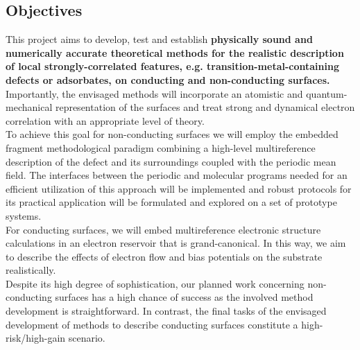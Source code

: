 \documentclass[a4paper,11pt,headings=normal]{scrartcl}
\begin{document}
\subsection{Objectives}
This project aims to develop, test and establish \textbf{physically sound and 
numerically accurate theoretical methods for the realistic description of 
local strongly-correlated features, e.g. transition-metal-containing defects or adsorbates, on conducting and non-conducting surfaces.}  Importantly, the 
envisaged methods will incorporate an atomistic and quantum-mechanical 
representation of the surfaces and treat strong and dynamical electron 
correlation with an appropriate level of theory.\\ 
To achieve this goal for non-conducting surfaces we will employ the embedded 
fragment methodological paradigm combining a high-level multireference 
description of the defect and its surroundings coupled with the periodic 
mean field. The interfaces between the periodic and molecular programs needed for 
an efficient utilization of this approach will be implemented and robust 
protocols for its practical application will be formulated and explored on a 
set of prototype systems.\\
For conducting surfaces, we will embed multireference electronic structure 
calculations in an electron reservoir that is grand-canonical. In this way, we 
aim to describe the effects of electron flow and bias potentials on the 
substrate realistically.\\
Despite its high degree of sophistication, our planned work concerning 
non-conducting surfaces has a high chance of success as the involved method 
development is straightforward. In contrast, the final tasks of the envisaged development of 
methods to describe conducting surfaces constitute a high-risk/high-gain 
scenario. 
\end{document}
